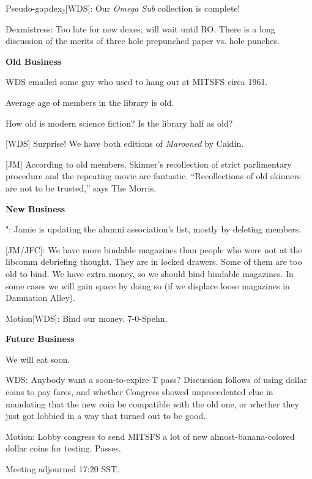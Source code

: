 \documentclass[12pt]{article}
\begin{document}
Pseudo-gapdex$_2$[WDS]: Our {\it Omega Sub} collection is complete!

Dexmistress: Too late for new dexes; will wait until RO.  There is a long
discussion of the merits of three hole prepunched paper vs. hole punches.


\vskip 12pt

\centerline{{\bf Old Business}}

\vskip 12pt

WDS emailed some guy who used to hang out at MITSFS circa 1961.

Average age of members in the library is old.

How old is modern science fiction?  Is the library half as old?

[WDS] Surprise!  We have both editions of  {\it Marooned} by Caidin.

[JM] According to old members, Skinner's recollection of strict
parlimentary procedure and the repeating movie are fantastic.
``Recollections of old skinners are not to be trusted,''  says The Morris.

\vskip 12pt

\centerline{{\bf New Business}}

\vskip 12pt

{\sym "}: Jamie is updating the alumni association's list, mostly by deleting members.

[JM/JFC]: We have more bindable magazines than people who were not at
the libcomm debriefing thought.  They are in locked drawers.  Some of
them are too old to bind.  We have extra money, so we should bind bindable
magazines.  In some cases we will gain space by doing so (if we displace
loose magazines in Damnation Alley).

Motion[WDS]: Bind our money.  \hbox{7-0-Spehn}.


\vskip 12pt

\centerline{{\bf Future Business}}

\vskip 12pt

We will eat soon.

WDS: Anybody want a soon-to-expire T pass?  Discussion follows of using
dollar coins to pay fares, and whether Congress showed unprecedented
clue in mandating that the new coin be compatible with the old one, or
whether they just got lobbied in a way that turned out to be good.

Motion: Lobby congress to send MITSFS a lot of new almost-banana-colored
dollar coins for testing.  Passes.

\vskip 12pt

Meeting adjourned 17:20 SST.
\end{document}
